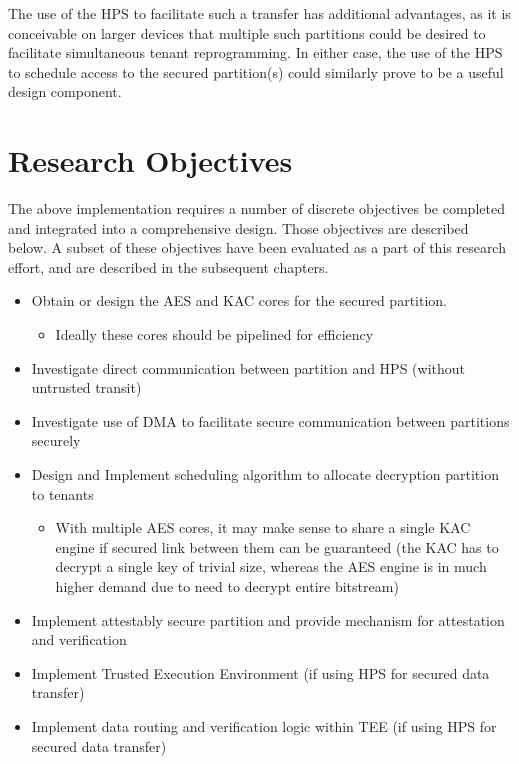 The use of the HPS to facilitate such a transfer has additional advantages, as it is conceivable on larger devices that multiple such partitions could be desired to facilitate simultaneous tenant reprogramming. In either case, the use of the HPS to schedule access to the secured partition(s) could similarly prove to be a useful design component.

\section{Research Objectives}\label{subsec:Obj}
The above implementation requires a number of discrete objectives be completed and integrated into a comprehensive design. Those objectives are described below. A subset of these objectives have been evaluated as a part of this research effort, and are described in the subsequent chapters.

\begin{itemize}
  \item Obtain or design the AES and KAC cores for the secured partition.
    \begin{itemize}  
      \item Ideally these cores should be pipelined for efficiency
    \end{itemize}
  \item Investigate direct communication between partition and HPS (without untrusted transit)
  \item Investigate use of DMA to facilitate secure communication between partitions securely
  \item Design and Implement scheduling algorithm to allocate decryption partition to tenants
    \begin{itemize}
      \item With multiple AES cores, it may make sense to share a single KAC engine if secured link between them can be guaranteed (the KAC has to decrypt a single key of trivial size, whereas the AES engine is in much higher demand due to need to decrypt entire bitstream)
    \end{itemize}
  \item Implement attestably secure partition and provide mechanism for attestation and verification
  \item Implement Trusted Execution Environment (if using HPS for secured data transfer)
  \item Implement data routing and verification logic within TEE (if using HPS for secured data transfer)
  \end{itemize}